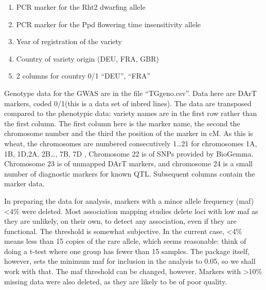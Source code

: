 \documentclass[
]{book}
\providecommand{\tightlist}{%
  \setlength{\itemsep}{0pt}\setlength{\parskip}{0pt}}
\begin{document}
\begin{enumerate}
\def\labelenumi{\arabic{enumi}.}
\tightlist
\item
  PCR marker for the Rht2 dwarfing allele
\item
  PCR marker for the Ppd flowering time insensitivity allele
\item
  Year of registration of the variety
\item
  Country of variety origin (DEU, FRA, GBR)
\item
  2 columns for country 0/1 ``DEU'', ``FRA''
\end{enumerate}

Genotype data for the GWAS are in the file ``TGgeno.csv''. Data here are DArT markers, coded 0/1(this is a data set of inbred lines). The data are transposed compared to the phenotypic data: variety names are in the first row rather than the first column. The first column here is the marker name, the second the chromosome number and the third the position of the marker in cM. As this is wheat, the chromosomes are numbered consecutively 1\ldots21 for chromosomes 1A, 1B, 1D,2A, 2B\ldots, 7B, 7D , Chromosome 22 is of SNPs provided by BioGemma. Chromosome 23 is of unmapped DArT markers, and chromosome 24 is a small number of diagnostic markers for known QTL. Subsequent columns contain the marker data.

In preparing the data for analysis, markers with a minor allele frequency (maf) \textless4\% were deleted. Most association mapping studies delete loci with low maf as they are unlikely, on their own, to detect any association, even if they are functional. The threshold is somewhat subjective. In the current case, \textless4\% means less than 15 copies of the rare allele, which seems reasonable: think of doing a t-test where one group has fewer than 15 samples. The package itself, however, sets the minimum maf for inclusion in the analysis to 0.05, so we shall work with that. The maf threshold can be changed, however. Markers with \textgreater10\% missing data were also deleted, as they are likely to be of poor quality.
\end{document}
